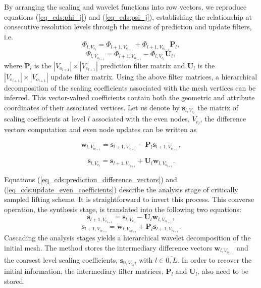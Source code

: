\documentclass[graybox]{svmult}
\begin{document}
	
	By arranging the scaling and wavelet functions into row vectors, we reproduce equations (\ref{eq_cds:phi_j}) and (\ref{eq_cds:psi_j}), establishing the relationship at consecutive resolution levels through the means of prediction and update filters, i.e.
	\begin{equation}
	\Phi_{l,V_{e_l}} = \Phi_{l+1,V_{e_{l+1}}} +  \Phi_{l+1, V_{o_{l+1}}} \mathbf{P}_l,
	\label{eq_cds:prediction_functions}
	\end{equation}
	\begin{equation}
	\Psi_{l,V_{o_{l+1}}} = \Phi_{l+1,V_{o_{l+1}}} - \Phi_{l,V_{e_l}}  \mathbf{U}_l,
	\label{eq_cds:update_functions}
	\end{equation}
	where $\mathbf{P}_l$ is the $|V_{o_{l+1}}| \times |V_{e_{l+1}}|$ prediction filter matrix and $\mathbf{U}_l$ is the  $|V_{e_{l+1}}| \times |V_{o_{l+1}}|$ update filter matrix.
	Using the above filter matrices, a hierarchical decomposition of the scaling coefficients associated with the mesh vertices can be inferred. This vector-valued coefficients contain both the geometric and attribute coordinates of their associated vertices. Let us denote by $\mathbf{s}_{l,V_{e_l}}$ the matrix of scaling coefficients at level $l$ associated with the even nodes, $V_{e_l}$, the difference vectors computation and even node updates can be written as
	
	\begin{equation}
	\mathbf{w}_{l,V_{o_{l+1}}} = \mathbf{s}_{l+1,V_{o_{l+1}}} - \mathbf{P}_l \mathbf{s}_{l+1,V_{e_{l+1}}},
	\label{eq_cds:prediction_difference_vectors} 
	\end{equation}
	
	\begin{equation}
	\mathbf{s}_{l,V_{e_l}} = \mathbf{s}_{l+1,V_{e_{l+1}}} + \mathbf{U}_l \mathbf{w}_{l,V_{o_{l+1}}}.
	\label{eq_cds:update_even_coefficients}
	\end{equation}
	
	Equations (\ref{eq_cds:prediction_difference_vectors}) and (\ref{eq_cds:update_even_coefficients}) describe the analysis stage of critically sampled lifting scheme. It is straightforward
	to invert this process. This converse operation, the synthesis stage, is translated into the following two equations:
	\begin{equation}
	\mathbf{s}_{l+1,V_{e_{l+1}}} = \mathbf{s}_{l,V_{e_l}} - \mathbf{U}_l \mathbf{w}_{l,V_{o_{l+1}}},
	\label{eq_cds:synthesis_odd}
	\end{equation}
	\begin{equation}
	\mathbf{s}_{l+1,V_{o_{l+1}}} = \mathbf{w}_{l,V_{o_{l+1}}} + \mathbf{P}_l \mathbf{s}_{l+1,V_{e_{l+1}}}.
	\label{eq_cds:synthesis_even}
	\end{equation}
	Cascading the analysis stages yields a hierarchical wavelet decomposition of the initial mesh. The method stores the intermediary difference vectors $\mathbf{w}_{l,V_{o_{l+1}}}$ and the 
	coarsest level scaling coefficients, $\mathbf{s}_{0, V_{e_0}}$, with $l \in \overline{0,L}$. In order to recover the initial information, the intermediary filter matrices, $\mathbf{P}_l$ and
	$\mathbf{U}_l$, also need to be stored.
	
\end{document}
